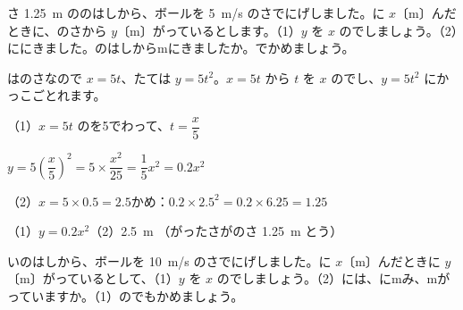 \begin{reidai}[\R{横}{よこ}に\R{投}{な}げたボールの\R{通}{とお}り\R{道}{みち}]
さ \qty{1.25}{m} ののはしから、ボールを \qty{5}{m/s} のさでにげしました。に $x$〔m〕んだときに、のさから $y$〔m〕がっているとします。（1）\nobreak $y$ を $x$ のでしましょう。（2）ににきました。のはしからmにきましたか。でかめましょう。\par
\kangaekata {}はのさなので $x=5t$、たては $y=5t^2$。$x=5t$ から $t$ を $x$ のでし、$y=5t^2$ にかっこごとれます。\par
\shiki（1）\nobreak $x=5t$ のを5でわって、$t=\dfrac{x}{5}$\par
\hspace*{4.3\zw}$y=5\left(\dfrac{x}{5}\right)^2=5\times\dfrac{x^2}{25}=\dfrac{1}{5}x^2=0.2x^2$\par
\hspace*{2.6\zw}（2）\nobreak $x=5\times0.5=2.5$\quad {}かめ：$0.2\times2.5^2=0.2\times6.25=1.25$\par
\kotae（1）\nobreak $y=0.2x^2$\quad（2）\nobreak \qty{2.5}{m} （がったさがのさ \qty{1.25}{m} とう）
\end{reidai}

\begin{jibun}
いのはしから、ボールを \qty{10}{m/s} のさでにげしました。に $x$〔m〕んだときに $y$〔m〕がっているとして、（1）\nobreak $y$ を $x$ のでしましょう。（2）には、にmみ、mがっていますか。（1）のでもかめましょう。
\end{jibun}

\label{bk:3-9:tsuma}

